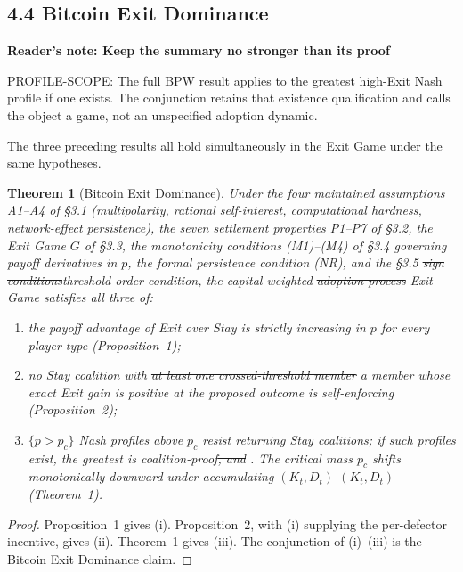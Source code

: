 \documentclass[12pt]{article}
\newtheorem{theorem}{Theorem}
\theoremstyle{definition}
\theoremstyle{remark}
\providecommand{\DIFaddtex}[1]{{\color{AddedText}#1}}
\providecommand{\DIFdeltex}[1]{{\color{DeletedText}\sout{#1}}}
\providecommand{\DIFaddbegin}{}
\providecommand{\DIFaddend}{}
\providecommand{\DIFdelbegin}{}
\providecommand{\DIFdelend}{}
\newcommand{\ReviewNote}[2]{\par\begin{mdframed}[backgroundcolor=blue!3,linecolor=NoteText,linewidth=0.6pt]\color{NoteText}\small\textbf{Reader's note: #1}\par #2\end{mdframed}\par}
\providecommand{\DIFadd}[1]{\texorpdfstring{\DIFaddtex{#1}}{#1}} %
\providecommand{\DIFdel}[1]{\texorpdfstring{\DIFdeltex{#1}}{}} %
\begin{document}
\subsection{4.4 Bitcoin Exit Dominance}


\ReviewNote{Keep the summary no stronger than its proof}{PROFILE-SCOPE: The full BPW result applies to the greatest high-Exit Nash profile if one exists. The conjunction retains that existence qualification and calls the object a game, not an unspecified adoption dynamic.}
The three preceding results all hold simultaneously in the Exit Game under the same hypotheses.

\begin{theorem}[Bitcoin Exit Dominance]
Under the four maintained assumptions A1--A4 of \S3.1 (multipolarity,
rational self-interest, computational hardness, network-effect
persistence), the seven settlement properties P1--P7 of \S3.2, the
Exit Game $G$ of \S3.3, the monotonicity conditions (M1)--(M4) of
\S3.4 governing payoff derivatives in $p$, \DIFaddbegin \DIFadd{the formal persistence condition (NR), }\DIFaddend and the \S3.5 \DIFdelbegin \DIFdel{sign
conditions}\DIFdelend \DIFaddbegin \DIFadd{threshold-order
condition}\DIFaddend , the capital-weighted \DIFdelbegin \DIFdel{adoption process }\DIFdelend \DIFaddbegin \DIFadd{Exit Game }\DIFaddend satisfies all three of:
\begin{enumerate}[label=(\roman*),nosep]
\item the payoff advantage of Exit over Stay is strictly increasing
in $p$ for every player type (Proposition~1);
\item no Stay coalition with \DIFdelbegin \DIFdel{at least one crossed-threshold
member }\DIFdelend \DIFaddbegin \DIFadd{a member whose exact Exit gain is positive at the proposed outcome }\DIFaddend is self-enforcing (Proposition~2);
\item \DIFdelbegin \DIFdel{$\{p > p_c\}$ }\DIFdelend \DIFaddbegin \DIFadd{Nash profiles above $p_c$ resist returning Stay coalitions; if such profiles exist, the greatest }\DIFaddend is coalition-proof\DIFdelbegin \DIFdel{, and }\DIFdelend \DIFaddbegin \DIFadd{. The critical mass }\DIFaddend $p_c$ shifts monotonically downward under accumulating \DIFdelbegin \DIFdel{$(K_t, D_t)$ }\DIFdelend \DIFaddbegin \DIFadd{$(K_t,D_t)$ }\DIFaddend (Theorem~1).
\end{enumerate}
\end{theorem}

\begin{proof}
Proposition~1 gives (i). Proposition~2, with (i) supplying the
per-defector incentive, gives (ii). Theorem~1 gives (iii). The
conjunction of (i)--(iii) is the Bitcoin Exit Dominance claim.
\end{proof}
\end{document}
